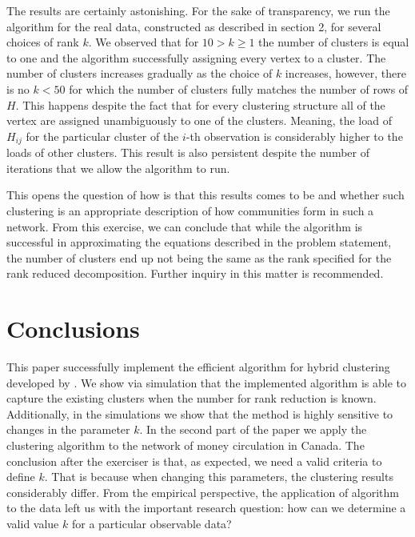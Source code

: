 \documentclass[11pt,letter]{article}%
\numberwithin{equation}{section}
\begin{document}
The results are certainly astonishing. For the sake of transparency, we run the algorithm for the real data, constructed as described in section 2, for several choices of rank $k$. We observed that for $10> k\geq1$  the number of clusters is equal to one and the algorithm successfully assigning every vertex to a cluster. The number of clusters increases gradually as the choice of $k$ increases, however, there is no $k<50$ for which the number of clusters fully matches the number of rows of $H$. This happens despite the fact that for every clustering structure all of the vertex are assigned unambiguously to one of the clusters. Meaning, the load of $H_{ij}$ for the particular cluster of the $i$-th observation is considerably higher to the loads of other clusters. This result is also persistent despite the number of iterations that we allow the algorithm to run.

This opens the question of how is that this results comes to be and whether such clustering is an appropriate description of how communities form in such a network. From this exercise, we can conclude that while the algorithm is successful in approximating the equations described in the problem statement, the number of clusters end up not being the same as the rank specified for the rank reduced decomposition.  Further inquiry in this matter is recommended. 

\section{Conclusions}

This paper successfully implement the efficient algorithm for hybrid clustering developed by \cite{Du2017}. We show via simulation that the implemented algorithm is able to capture the existing clusters when the number for rank reduction is known. Additionally, in the simulations we show that the method is highly sensitive to changes in the parameter $k$. In the second part of the paper we apply the clustering algorithm to the network of money circulation in Canada. The conclusion after the exerciser is that, as expected, we need a valid criteria to define $k$.  That is because when changing this parameters, the clustering results considerably differ. From the empirical perspective, the application of algorithm to the data left us with the important research question: how can we determine a valid value $k$ for a particular observable data? 


\clearpage
\end{document}
